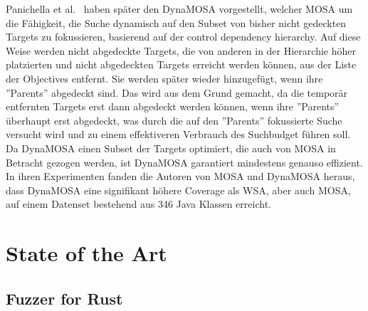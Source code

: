 \documentclass{article}
\begin{document}
Panichella et al.~\cite{Panichella2018} haben später den \ac{DynaMOSA} vorgestellt, welcher \ac{MOSA} um die Fähigkeit, die Suche dynamisch auf den Subset von bisher nicht gedeckten Targets zu fokussieren, basierend auf der control dependency hierarchy. Auf diese Weise werden nicht abgedeckte Targets, die von anderen in der Hierarchie höher platzierten und nicht abgedeckten Targets erreicht werden können, aus der Liste der Objectives entfernt. Sie werden später wieder hinzugefügt, wenn ihre ''Parents'' abgedeckt sind. Das wird aus dem Grund gemacht, da die temporär entfernten Targets erst dann abgedeckt werden können, wenn ihre ''Parents'' überhaupt erst abgedeckt, was durch die auf den ''Parents'' fokussierte Suche versucht wird und zu einem effektiveren Verbrauch des Suchbudget führen soll. Da \ac{DynaMOSA} einen Subset der Targets optimiert, die auch von \ac{MOSA} in Betracht gezogen werden, ist \ac{DynaMOSA} garantiert mindestens genauso effizient. In ihren Experimenten fanden die Autoren von \ac{MOSA} und \ac{DynaMOSA} heraus, dass \ac{DynaMOSA} eine signifikant höhere Coverage als \ac{WSA}, aber auch \ac{MOSA}, auf einem Datenset bestehend aus 346 Java Klassen erreicht. 

\section{State of the Art}
\subsection{Fuzzer for Rust}
\end{document}
